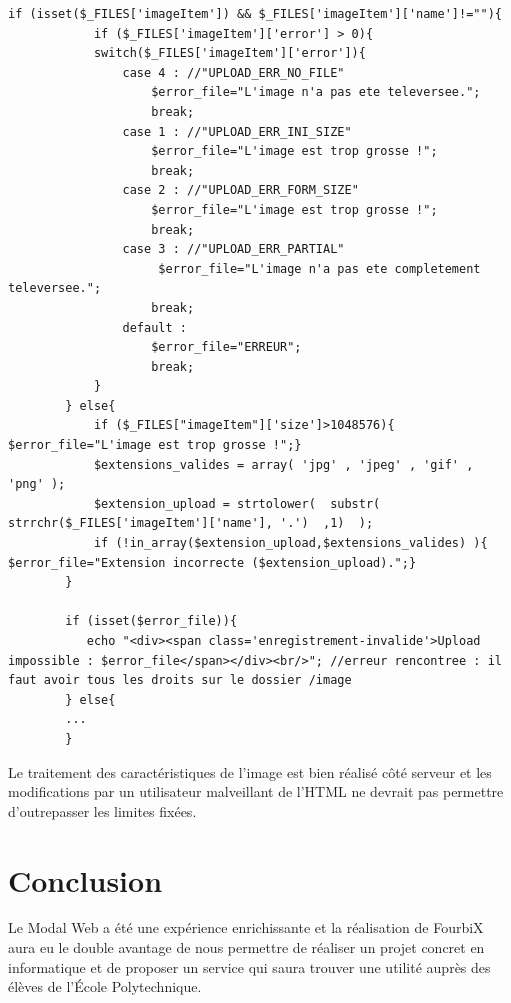 \documentclass[titlepage,11pt,a4paper]{article}
\begin{document}
\begin{lstlisting}[title=Securite upload image]
if (isset($_FILES['imageItem']) && $_FILES['imageItem']['name']!=""){
            if ($_FILES['imageItem']['error'] > 0){
            switch($_FILES['imageItem']['error']){
                case 4 : //"UPLOAD_ERR_NO_FILE"
                    $error_file="L'image n'a pas ete televersee.";
                    break;
                case 1 : //"UPLOAD_ERR_INI_SIZE"
                    $error_file="L'image est trop grosse !";
                    break;
                case 2 : //"UPLOAD_ERR_FORM_SIZE"
                    $error_file="L'image est trop grosse !";
                    break;
                case 3 : //"UPLOAD_ERR_PARTIAL"
                     $error_file="L'image n'a pas ete completement televersee.";
                    break;
                default :
                    $error_file="ERREUR";
                    break;
            }
        } else{
            if ($_FILES["imageItem"]['size']>1048576){ $error_file="L'image est trop grosse !";}
            $extensions_valides = array( 'jpg' , 'jpeg' , 'gif' , 'png' );
            $extension_upload = strtolower(  substr(  strrchr($_FILES['imageItem']['name'], '.')  ,1)  );
            if (!in_array($extension_upload,$extensions_valides) ){ $error_file="Extension incorrecte ($extension_upload).";}
        }
        
        if (isset($error_file)){
           echo "<div><span class='enregistrement-invalide'>Upload impossible : $error_file</span></div><br/>"; //erreur rencontree : il faut avoir tous les droits sur le dossier /image
        } else{
        ...
        }
\end{lstlisting}

Le traitement des caractéristiques de l'image est bien réalisé côté serveur et les modifications par un utilisateur malveillant de l'HTML ne devrait pas permettre d'outrepasser les limites fixées.

\section{Conclusion}

Le Modal Web a été une expérience enrichissante et la réalisation de FourbiX aura eu le double avantage de nous permettre de réaliser un projet concret en informatique et de proposer un service qui saura trouver une utilité auprès des élèves de l'École Polytechnique.
\end{document}
